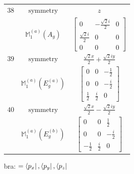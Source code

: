 \documentclass[fleqn,8pt,landscape]{jsarticle}
\begin{document}
\begin{longtable}{ccc}
$ 38 $ & $ \text{symmetry} $ & $ z $ \\
$  $ & $ \mathbb{M}_{1}^{(a)}(A_{g}) $ & $ \begin{bmatrix} 0 & - \frac{\sqrt{2} i}{2} & 0 \\ \frac{\sqrt{2} i}{2} & 0 & 0 \\ 0 & 0 & 0 \end{bmatrix} $ \\ \hline
$ 39 $ & $ \text{symmetry} $ & $ \frac{\sqrt{2} x}{2} + \frac{\sqrt{2} i y}{2} $ \\
$  $ & $ \mathbb{M}_{1}^{(a)}(E_{g}^{(a)}) $ & $ \begin{bmatrix} 0 & 0 & - \frac{1}{2} \\ 0 & 0 & - \frac{i}{2} \\ \frac{1}{2} & \frac{i}{2} & 0 \end{bmatrix} $ \\ \hline
$ 40 $ & $ \text{symmetry} $ & $ \frac{\sqrt{2} x}{2} - \frac{\sqrt{2} i y}{2} $ \\
$  $ & $ \mathbb{M}_{1}^{(a)}(E_{g}^{(b)}) $ & $ \begin{bmatrix} 0 & 0 & \frac{1}{2} \\ 0 & 0 & - \frac{i}{2} \\ - \frac{1}{2} & \frac{i}{2} & 0 \end{bmatrix} $ \\ \hline
\end{longtable}
bra: $=\bra{p_{x}}, \bra{p_{y}}, \bra{p_{z}}$
\end{document}
